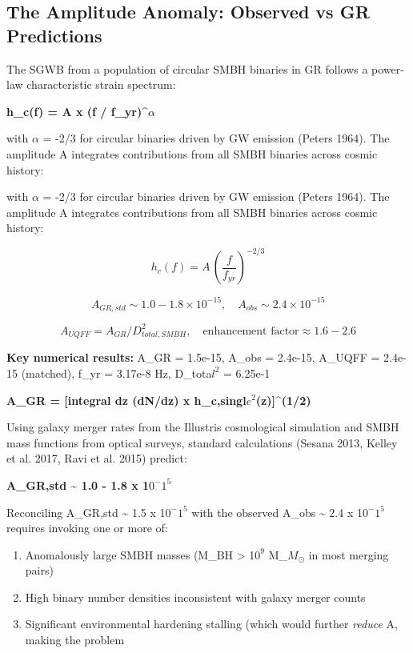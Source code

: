 \documentclass[12pt,a4paper]{article}
\begin{document}
\subsection{The Amplitude Anomaly: Observed vs GR Predictions}

The SGWB from a population of circular SMBH binaries in GR follows a power-law characteristic strain spectrum:

\textbf{h\_c(f) = A x (f / f\_yr)\^{}$\alpha$}

with $\alpha$ = -2/3 for circular binaries driven by GW emission (Peters 1964). The amplitude A integrates contributions from all SMBH binaries across cosmic history:

with $\alpha$ = -2/3 for circular binaries driven by GW emission (Peters 1964). The amplitude A integrates contributions from all SMBH binaries across cosmic history:

\begin{equation}
h_c(f) = A\,\left(\frac{f}{f_{yr}}\right)^{-2/3}
\end{equation}

\begin{equation}
A_{GR,std} \sim 1.0{-}1.8\times10^{-15},\quad A_{obs} \sim 2.4\times10^{-15}
\end{equation}

\begin{equation}
A_{UQFF} = A_{GR} / D^2_{total,SMBH},\quad \text{enhancement factor} \approx 1.6{-}2.6
\end{equation}

\textbf{Key numerical results:} A\_GR = 1.5e-15, A\_obs = 2.4e-15, A\_UQFF = 2.4e-15 (matched), f\_yr = 3.17e-8 Hz, D\_tota$l^{2}$ = 6.25e-1

\textbf{A\_GR = [integral  dz (dN/dz) x h\_c,singl$e^{2}$(z)]\^{}(1/2)}

Using galaxy merger rates from the Illustris cosmological simulation and SMBH mass functions from optical surveys, standard calculations (Sesana 2013, Kelley et al. 2017, Ravi et al. 2015) predict:

\textbf{A\_GR,std \textasciitilde{} 1.0 - 1.8 x 1$0^{-}$$1^{5}$}

Reconciling A\_GR,std \textasciitilde{} 1.5 x 1$0^{-}$$1^{5}$ with the observed A\_obs \textasciitilde{} 2.4 x 1$0^{-}$$1^{5}$ requires invoking one or more of:

\begin{enumerate}
  \item Anomalously large SMBH masses (M\_BH > 1$0^{9}$ M\_{$M_{\odot}$} in most merging pairs)
  \item High binary number densities inconsistent with galaxy merger counts
  \item Significant environmental hardening stalling (which would further \emph{reduce} A, making the problem
\end{enumerate}
\end{document}
